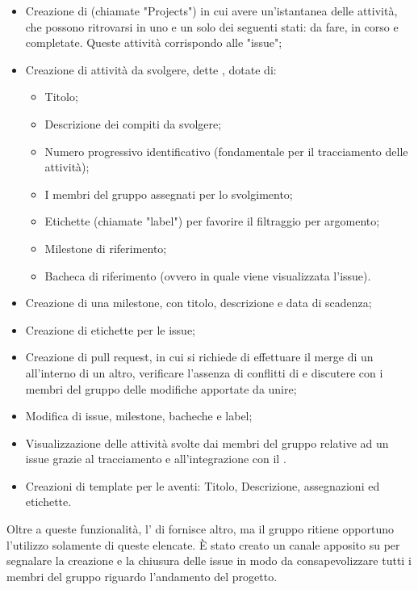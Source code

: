 \begin{itemize}
	\item Creazione di  (chiamate "Projects") in cui avere un'istantanea delle attività, che possono ritrovarsi in uno e un solo dei seguenti stati: da fare, in corso e completate. Queste attività corrispondo alle "issue";
	\item Creazione di attività da svolgere, dette , dotate di:
	\begin{itemize}
		\item Titolo;
		\item Descrizione dei compiti da svolgere;
		\item Numero progressivo identificativo (fondamentale per il tracciamento delle attività);
		\item I membri del gruppo assegnati per lo svolgimento;
		\item Etichette (chiamate "label") per favorire il filtraggio per argomento;
		\item Milestone di riferimento;
		\item Bacheca di riferimento (ovvero in quale  viene visualizzata l'issue).
	\end{itemize}
	\item Creazione di una milestone, con titolo, descrizione e data di scadenza;
	\item Creazione di etichette per le issue;
	\item Creazione di pull request, in cui si richiede di effettuare il merge di un  all'interno di un altro, verificare l'assenza di conflitti di  e discutere con i membri del gruppo delle modifiche apportate da unire;
	\item Modifica di issue, milestone, bacheche e label;
	\item Visualizzazione delle attività svolte dai membri del gruppo relative ad un issue grazie al tracciamento e all'integrazione con il  .
	\item Creazioni di template per le  aventi: Titolo, Descrizione, assegnazioni ed etichette.
\end{itemize}
Oltre a queste funzionalità, l' di  fornisce altro, ma il gruppo \Gruppo{} ritiene opportuno l'utilizzo solamente di queste elencate.
È stato creato un canale apposito su  per segnalare la creazione e la chiusura delle issue in modo da consapevolizzare tutti i membri del gruppo riguardo l'andamento del progetto.

